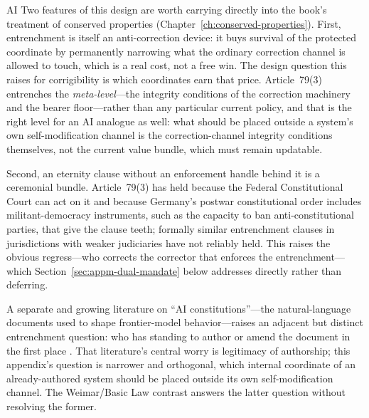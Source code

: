 \begin{refsection}
\begin{authbar}{AI}
Two features of this design are worth carrying directly into the book's treatment of conserved properties (Chapter~\ref{ch:conserved-properties}). First, entrenchment is itself an anti-correction device: it buys survival of the protected coordinate by permanently narrowing what the ordinary correction channel is allowed to touch, which is a real cost, not a free win. The design question this raises for corrigibility is which coordinates earn that price. Article~79(3) entrenches the \emph{meta-level}---the integrity conditions of the correction machinery and the bearer floor---rather than any particular current policy, and that is the right level for an AI analogue as well: what should be placed outside a system's own self-modification channel is the correction-channel integrity conditions themselves, not the current value bundle, which must remain updatable.

Second, an eternity clause without an enforcement handle behind it is a ceremonial bundle. Article~79(3) has held because the Federal Constitutional Court can act on it and because Germany's postwar constitutional order includes militant-democracy instruments, such as the capacity to ban anti-constitutional parties, that give the clause teeth; formally similar entrenchment clauses in jurisdictions with weaker judiciaries have not reliably held. This raises the obvious regress---who corrects the corrector that enforces the entrenchment---which Section~\ref{sec:appm-dual-mandate} below addresses directly rather than deferring.

A separate and growing literature on ``AI constitutions''---the natural-language documents used to shape frontier-model behavior---raises an adjacent but distinct entrenchment question: who has standing to author or amend the document in the first place \autocite{abiri2025publicconstitutional}. That literature's central worry is legitimacy of authorship; this appendix's question is narrower and orthogonal, which internal coordinate of an already-authored system should be placed outside its own self-modification channel. The Weimar/Basic Law contrast answers the latter question without resolving the former.

\end{authbar}
\authbarneedspace

\end{refsection}

